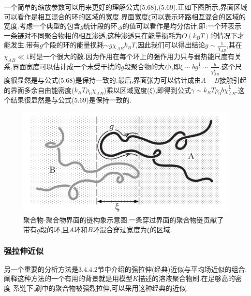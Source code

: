 一个简单的缩放参数可以用来更好的理解公式(5.68),(5.69).正如下图所示,界面区域可以看作是相互混合的环的区域的宽度.界面宽度$\xi$可以表示环路相互混合的区域的宽度.考虑一个典型的包含$g$统计段的环,$g$的值可以看作是均分估计,即:一个环表示一条链对不同聚合物相的相互渗透,这种渗透只在能量损耗为$O(k_B T)$的情况下才能发生.带有$g$个段的环的能量损耗$\sim g\chi_{AB}k_BT$,因此我们可以得出结论$g\sim \frac{1}{\chi_{AB}}$,其在$\chi_{AB} \ll1$时是一个很大的数.因为作用在每个环上的强作用力只与弱热能尺度有关系,界面宽度可以估计成一个未受干扰的$g$段聚合物的大小,即$\xi \sim bg^{\frac{1}{2}}\sim \frac{b}{\chi_{AB}^{\frac{1}{2}}}$.这个尺度很显然是与公式(5.68)是保持一致的.最后,界面张力可以估计成由$A−B$接触引起的界面多余自由能密度($k_B T\rho_0\chi_{AB}$)乘以区域宽度($\xi$),即得到公式$\gamma\sim k_B T\rho_0b\chi_{AB}^{\frac{1}{2}}$.这个结果很显然是与公式(5.69)是保持一致的.
\begin{figure}[H]
	\centering
	\includegraphics[width=12cm]{./figures/fig5-5.png}
	\caption{聚合物-聚合物界面的链构象示意图.一条穿过界面的聚合物链贡献了带有$g$段的环,且$A$环和$B$环混合穿过宽度为$\xi$的区域.}
\end{figure}

\subsubsection{强拉伸近似}
另一个重要的分析方法是3.4.4.2节中介绍的强拉伸(经典)近似与平均场近似的组合.阐释这种方法的一个有用的背景就是用模型$K$描述的溶液聚合物刷.在足够高的密度
系链下,刷中的聚合物被强烈拉伸,可以采用这种经典的近似.

